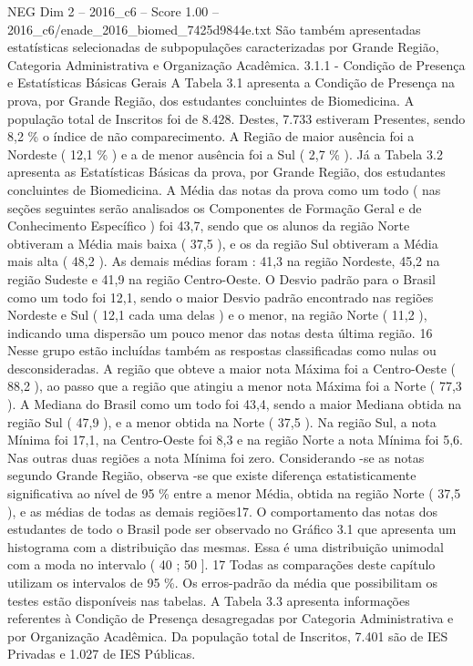 \begin{textsample}{NEG Dim 2 – 2016\_c6 – Score 1.00 – 2016\_c6/enade\_2016\_biomed\_7425d9844e.txt}
São também apresentadas estatísticas selecionadas de subpopulações caracterizadas por Grande Região, Categoria Administrativa e Organização Acadêmica. 3.1.1 - Condição de Presença e Estatísticas Básicas Gerais A Tabela 3.1 apresenta a Condição de Presença na prova, por Grande Região, dos estudantes concluintes de Biomedicina.
A população total de Inscritos foi de 8.428.
Destes, 7.733 estiveram Presentes, sendo 8,2 \% o índice de não comparecimento.
A Região de maior ausência foi a Nordeste ( 12,1 \% ) e a de menor ausência foi a Sul ( 2,7 \% ).
Já a Tabela 3.2 apresenta as Estatísticas Básicas da prova, por Grande Região, dos estudantes concluintes de Biomedicina.
A Média das notas da prova como um todo ( nas seções seguintes serão analisados os Componentes de Formação Geral e de Conhecimento Específico ) foi 43,7, sendo que os alunos da região Norte obtiveram a Média mais baixa ( 37,5 ), e os da região Sul obtiveram a Média mais alta ( 48,2 ).
As demais médias foram : 41,3 na região Nordeste, 45,2 na região Sudeste e 41,9 na região Centro-Oeste.
O Desvio padrão para o Brasil como um todo foi 12,1, sendo o maior Desvio padrão encontrado nas regiões Nordeste e Sul ( 12,1 cada uma delas ) e o menor, na região Norte ( 11,2 ), indicando uma dispersão um pouco menor das notas desta última região. 16 Nesse grupo estão incluídas também as respostas classificadas como nulas ou desconsideradas.
A região que obteve a maior nota Máxima foi a Centro-Oeste ( 88,2 ), ao passo que a região que atingiu a menor nota Máxima foi a Norte ( 77,3 ).
A Mediana do Brasil como um todo foi 43,4, sendo a maior Mediana obtida na região Sul ( 47,9 ), e a menor obtida na Norte ( 37,5 ).
Na região Sul, a nota Mínima foi 17,1, na Centro-Oeste foi 8,3 e na região Norte a nota Mínima foi 5,6.
Nas outras duas regiões a nota Mínima foi zero.
Considerando -se as notas segundo Grande Região, observa -se que existe diferença estatisticamente significativa ao nível de 95 \% entre a menor Média, obtida na região Norte ( 37,5 ), e as médias de todas as demais regiões17.
O comportamento das notas dos estudantes de todo o Brasil pode ser observado no Gráfico 3.1 que apresenta um histograma com a distribuição das mesmas.
Essa é uma distribuição unimodal com a moda no intervalo ( 40 ; 50 ]. 17 Todas as comparações deste capítulo utilizam os intervalos de 95 \%.
Os erros-padrão da média que possibilitam os testes estão disponíveis nas tabelas.
A Tabela 3.3 apresenta informações referentes à Condição de Presença desagregadas por Categoria Administrativa e por Organização Acadêmica.
Da população total de Inscritos, 7.401 são de IES Privadas e 1.027 de IES Públicas.

\end{textsample}
